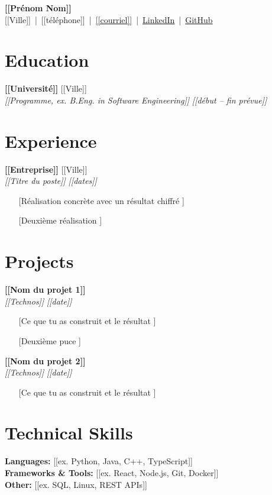 \documentclass[10pt,letterpaper]{article}
\newcommand{\entry}[4]{\textbf{#1} \hfill #2\\ \textit{#3} \hfill \textit{#4}}
\begin{document}
\begin{center}
{\LARGE\bfseries [[Prénom Nom]]}\\[2pt]
[[Ville]] \,|\, [[téléphone]] \,|\, \href{mailto:[[courriel]]}{[[courriel]]} \,|\, \href{[[lien LinkedIn]]}{LinkedIn} \,|\, \href{[[lien GitHub]]}{GitHub}
\end{center}

\section{Education}
\entry{[[Université]]}{[[Ville]]}{[[Programme, ex. B.Eng. in Software Engineering]]}{[[début -- fin prévue]]}

\section{Experience}
\entry{[[Entreprise]]}{[[Ville]]}{[[Titre du poste]]}{[[dates]]}
\begin{itemize}
  \item [[Réalisation concrète avec un résultat chiffré]]
  \item [[Deuxième réalisation]]
\end{itemize}

\section{Projects}
\entry{[[Nom du projet 1]]}{}{[[Technos]]}{[[date]]}
\begin{itemize}
  \item [[Ce que tu as construit et le résultat]]
  \item [[Deuxième puce]]
\end{itemize}
\entry{[[Nom du projet 2]]}{}{[[Technos]]}{[[date]]}
\begin{itemize}
  \item [[Ce que tu as construit et le résultat]]
\end{itemize}

\section{Technical Skills}
\textbf{Languages:} [[ex. Python, Java, C++, TypeScript]]\\
\textbf{Frameworks \& Tools:} [[ex. React, Node.js, Git, Docker]]\\
\textbf{Other:} [[ex. SQL, Linux, REST APIs]]
\end{document}
